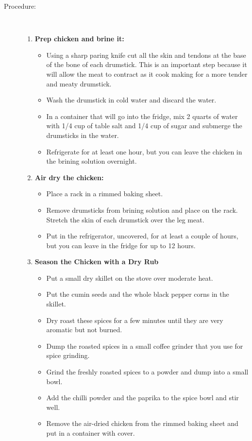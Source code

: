 \documentclass[11pt,letterpaper]{article}
\begin{document}
\begin{description}
\item[Procedure:]\ \\
	\begin{enumerate}
	\item {\bf Prep chicken and brine it:}
		\begin{itemize}
		\item Using a sharp paring knife cut all the skin and tendons at the base of the bone of each drumstick. This is an important step because it will allow the meat to contract as it cook making for a more tender and meaty drumstick. 
		\item Wash the drumstick in cold water and discard the water.
		\item In  a container that will go into the fridge,  mix 2 quarts of water with 1/4 cup of table salt and 1/4 cup of sugar and submerge the drumsticks in the water.
		\item Refrigerate for at least one hour, but you can leave the chicken in the brining solution overnight.
		\end{itemize}
	\item {\bf Air dry the chicken:}
		\begin{itemize}
		\item Place a rack in a rimmed baking sheet.
		\item Remove drumsticks from brining solution and place on the rack. Stretch the skin of each drumstick over the leg meat.
		\item Put in the refrigerator, uncovered, for at least a couple of hours, but you can leave in the fridge for up to 12 hours. 
		\end{itemize}
	\item {\bf Season the Chicken with a Dry Rub}
		\begin{itemize}
		\item Put a small dry skillet on the stove over moderate heat.
		\item Put the cumin seeds and the whole black pepper corns in the skillet.
		\item Dry roast these spices for a few minutes until they are very aromatic but not burned.
		\item Dump the roasted spices in a small coffee grinder that you use for spice grinding.
		\item Grind the freshly roasted spices to a powder and dump into a small bowl.
		\item Add the chilli powder and the paprika to the spice bowl and stir well.
		\item Remove the air-dried chicken from the rimmed baking sheet and put in a container with cover.

\end{itemize}
\end{enumerate}
\end{description}
\end{document}
